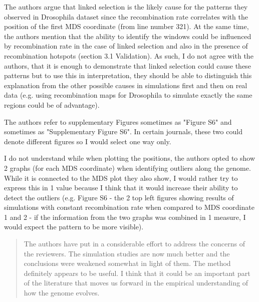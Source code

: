 \begin{point}{}
    The authors argue that linked selection is the likely cause for the patterns they observed in Drosophila dataset since the recombination rate correlates with the position of the first MDS coordinate (from line number 321). At the same time, the authors mention that the ability to identify the windows could be influenced by recombination rate in the case of linked selection and also in the presence of recombination hotspots (section 3.1 Validation). As such, I do not agree with the authors, that it is enough to demonstrate that linked selection could cause these patterns but to use this in interpretation, they should be able to distinguish this explanation from the other possible causes in simulations first and then on real data (e.g. using recombination maps for Drosophila to simulate exactly the same regions could be of advantage).
\end{point}

\reply{
}

\begin{point}{}
    The authors refer to supplementary Figures sometimes as "Figure S6" and sometimes as "Supplementary Figure S6". In certain journals, these two could denote different figures so I would select one way only.
\end{point}

\reply{
}

\begin{point}{}
    I do not understand while when plotting the positions, the authors opted to show 2 graphs (for each MDS coordinate) when identifying outliers along the genome. While it is connected to the MDS plot they also show, I would rather try to express this in 1 value because I think that it would increase their ability to detect the outliers (e.g. Figure S6 - the 2 top left figures showing results of simulations with constant recombination rate when compared to MDS coordinate 1 and 2 - if the information from the two graphs was combined in 1 measure, I would expect the pattern to be more visible).
\end{point}

\reply{
}



\begin{quote}
    The authors have put in a considerable effort to address the concerns of the reviewers. The simulation studies are now much better and the conclusions were weakened somewhat in light of them. The method definitely appears to be useful. I think that it could be an important part of the literature that moves us forward in the empirical understanding of how the genome evolves.
\end{quote}


